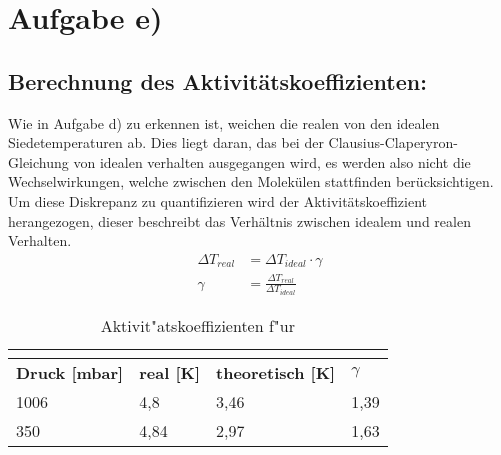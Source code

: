 \section{Aufgabe e)}
\subsection{Berechnung des Aktivitätskoeffizienten:}
Wie in Aufgabe d) zu erkennen ist, weichen die realen von den idealen
Siedetemperaturen ab. Dies liegt daran, das bei der Clausius-Claperyron-Gleichung von idealen verhalten
ausgegangen wird, es werden also nicht die Wechselwirkungen, welche zwischen den Molekülen stattfinden berücksichtigen.
Um diese Diskrepanz zu quantifizieren wird der Aktivitätskoeffizient herangezogen, dieser beschreibt das Verhältnis
zwischen idealem und realen Verhalten.
\begin{align*}
	\Delta T_{real} & = \Delta T_{ideal} \cdot \gamma            \\
	\gamma          & = \frac{\Delta T_{real}}{\Delta T_{ideal}}
\end{align*}


\newline

\begin{table}[H]
	\centering 
	\label{tab: Aktivitätskoeffizient_NaCl}
	\begin{tabular}{|l|l|l|l|}
		\hline
		\multicolumn{4}{|c|}{\textbf{\ce{NaCl}}}                                                 \\\hline
		\textbf{Druck [mbar]} & \textbf{real [K]} & \textbf{theoretisch [K]} & \textbf{$\gamma$} \\\hline
		1006                  & 4,8               & 3,46                     & 1,39              \\
		350                   & 4,84              & 2,97                     & 1,63              \\\hline
	\end{tabular}
	\caption{Aktivit"atskoeffizienten f"ur }
\end{table}

